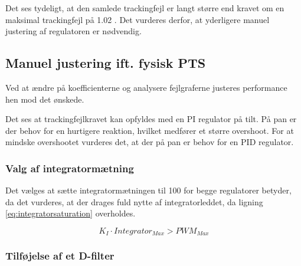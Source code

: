 Det ses tydeligt, at den samlede trackingfejl er langt større end kravet om en 
maksimal trackingfejl på 1.02 \degree.
Det vurderes derfor, at yderligere manuel justering af regulatoren er nødvendig.

\subsection{Manuel justering ift. fysisk PTS}

Ved at ændre på koefficienterne og analysere fejlgraferne justeres performance 
hen mod det ønskede.

Det ses at trackingfejlkravet kan opfyldes med en PI regulator på tilt.
På pan er der behov for en hurtigere reaktion, hvilket medfører et større overshoot. 
For at mindske overshootet vurderes det, at der på pan er behov for en PID 
regulator.


\subsubsection{Valg af integratormætning}
Det vælges at sætte integratormætningen til 100 for begge regulatorer betyder, da det vurderes, at der drages
fuld nytte af integratorleddet, da ligning \ref{eq:integratorsaturation} 
overholdes.

\begin{equation}
	K_I \cdot Integrator_{Max} > PWM_{Max}
\label{eq:integratorsaturation} 
\end{equation}


\subsubsection{Tilføjelse af et D-filter}






